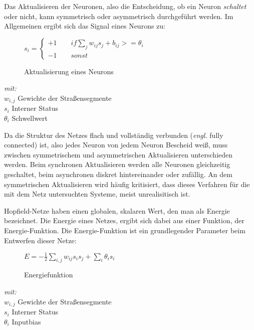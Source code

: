 Das Aktualisieren der Neuronen, also die Entscheidung, ob ein Neuron \textit{schaltet} oder nicht, kann symmetrisch oder asymmetrisch durchgeführt werden. Im Allgemeinen ergibt sich das Signal eines Neurons zu:

\begin{figure}[H]
    \( s_i =  \begin{cases}
    +1 \quad \quad if \sum_j w_{ij}s_j + b_{ij} >= \theta_i\\
    -1 \quad \quad sonst\end{cases}\)
    \caption{Aktualisierung eines Neurons}
    \label{func:neuron_activation}
\end{figure}

\begin{minipage}{0.9\textwidth}
\textit{mit:} \\
\(w_{i,j}\) Gewichte der Straßensegmente\\
\(s_i\) Interner Status \\
\(\theta _{i}\) Schwellwert\\
\end{minipage}

Da die Struktur des Netzes flach und vollständig verbunden (\textit{engl.} fully connected) ist, also jedes Neuron von jedem Neuron Bescheid weiß, muss zwischen symmetrischem und asymmetrischen Aktualisieren unterschieden werden. Beim synchronen Aktualisieren werden alle Neuronen gleichzeitig geschaltet, beim asynchronen diskret hintereinander oder zufällig. An dem symmetrischen Aktualisieren wird häufig kritisiert, dass dieses Verfahren für die mit dem Netz untersuchten Systeme, meist unrealisitisch ist.

Hopfield-Netze haben einen globalen, skalaren Wert, den man als Energie bezeichnet. Die Energie eines Netzes, ergibt sich dabei aus einer Funktion, der Energie-Funktion. Die Energie-Funktion ist ein grundlegender Parameter beim Entwerfen dieser Netze:

\begin{figure}[H]
    \(E=-{\frac  12}\sum _{{i,j}}{w_{{ij}}{s_{i}}{s_{j}}}+\sum _{i}{\theta _{i}}{s_{i}}\)
    \caption{Energiefunktion}
    \label{func:energy_function}
\end{figure}

\begin{minipage}{0.9\textwidth}
\textit{mit:} \\
\(w_{i,j}\) Gewichte der Straßensegmente\\
\(s_i\) Interner Status \\
\(\theta _{i}\) Inputbias \\
\end{minipage}

